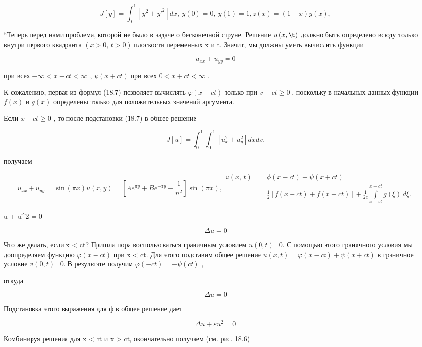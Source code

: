 \documentclass[
  ukrainian,
]{article}
\begin{document}
\[
J[y] = \int_{0}^{1} [y^{2} + {y'}^{2}] dx, \ y(0) = 0, \ y(1) = 1,
z(x) = (1 - x) y(x),
\]

``Теперь перед нами проблема, которой не было в задаче о бесконечной
струне. Решение \(u\left(x,\t\right)\) должно быть определено всюду
только внутри первого квадранта \((x>0,\,t>0)\) плоскости переменных x и
t. Значит, мы должны уметь вычислить функции

\[
u_{xx} + u_{yy} = 0
\]

при всех \(-\infty < x-ct < \infty\) , \(\psi(x+ct)\) при всех
\(0 < x+ct < \infty\) .

К сожалению, первая из формул (18.7) позволяет вычислять
\(\varphi(x-ct)\) только при \(x-ct\geqslant 0\) , поскольку в начальных
данных функции \(f(x)\) и \(g(x)\) определены только для положительных
значений аргумента.

Если \(x-ct \geqslant 0\) , то после подстановки (18.7) в общее решение

\[
J[u] = \int_{0}^{1} \int_{0}^{1} [u_{x}^{2} + u_{y}^{2}] dx dx.
\]

получаем

\[
u_{xx} + u_{yy} = \sin(\pi x)
u(x, y) = \left[Ae^{\pi y} + Be^{-\pi y} - \frac{1}{n^2}\right] \sin(\pi x),
\begin{split} u\left(x,\,t\right) &= \phi\left(x-ct\right) + \psi\left(x+ct\right) = \\ &= \frac{1}{2} \left[ f\left(x-ct\right) + f\left(x+ct\right) \right] + \frac{1}{2c} \int\limits_{x-ct}^{x+ct} g\left(\xi\right) \, d\xi. \end{split}
\]

 u + u\^{}2 = 0

\[
\Delta u = 0
\]

Что же делать, если x \textless{} ct? Пришла пора воспользоваться
граничным условием \(u(0,t)\)=0. С помощью этого граничного условия мы
доопределяем функцию \(\varphi(x-ct)\) при x \textless{} ct. Для этого
подставим общее решение \(u(x,t)=\varphi(x-ct)+\psi(x+ct)\) в граничное
условие \(u(0,t)\)=0. В результате получим \(\varphi(-ct)=-\psi(ct)\) ,

откуда

\[
\Delta u = 0
\]

Подстановка этого выражения для ф в общее решение дает

\[
\Delta u + \varepsilon u^2 = 0
\]

Комбинируя решения для x \textless{} ct и x \textgreater{} ct,
окончательно получаем (см. рис. 18.6)
\end{document}
